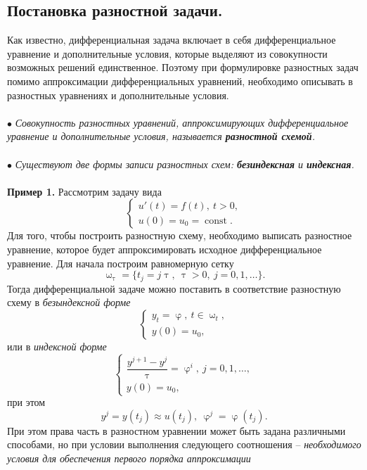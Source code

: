 \documentclass[a4paper, 12pt]{report}
\numberwithin{equation}{section}
\renewcommand{\varphi}{\upvarphi}
\renewcommand{\tau}{\uptau}
\renewcommand{\omega}{\upomega}
\newcommand{\const}{\operatorname{const}}
\begin{document}
\subsection{Постановка разностной задачи.}
Как известно, дифференциальная задача включает в себя дифференциальное уравнение и дополнительные условия, которые выделяют из совокупности возможных решений единственное. Поэтому при формулировке разностных задач помимо аппроксимации дифференциальных уравнений, необходимо описывать в разностных уравнениях и дополнительные условия.\\\\
$\bullet$ \textit{Совокупность разностных уравнений, аппроксимирующих дифференциальное уравнение и дополнительные условия, называется \textbf{разностной схемой}.}\\\\
$\bullet$ \textit{Существуют две формы записи разностных схем: \textbf{безиндексная} и \textbf{индексная}.}\\\\
\textbf{Пример 1.} Рассмотрим задачу вида 
\begin{equation}
	\begin{cases}
	u'(t) = f(t),\ t>0,\\
u(0) = u_0 = \const.
\end{cases}
\end{equation}
Для того, чтобы построить разностную схему, необходимо выписать разностное уравнение, которое будет аппроксимировать исходное дифференциальное уравнение. Для начала построим равномерную сетку $$\omega_\tau = \{t_j = j\tau,\ \tau>0,\ j=0,1,\ldots\}.$$
Тогда дифференциальной задаче можно поставить в соответствие разностную схему в \textit{безындексной форме}
\begin{equation}
	\begin{cases}
	y_t = \varphi,\ t \in \omega _t,\\
	y(0) = u_0,
\end{cases}
\end{equation}
или в \textit{индексной форме}
\begin{equation}
	\begin{cases}
		\dfrac{y^{j+1}-y^j}{\tau} = \varphi^i,\ j=0,1,\ldots,\\
		y(0) = u_0,
	\end{cases}
\end{equation}
при этом $$y^j = y(t_j)\approx u(t_j),\ \varphi^j = \varphi(t_j).$$
При этом права часть в разностном уравнении может быть задана различными способами, но при условии выполнения следующего соотношения -- \textit{необходимого условия для обеспечения первого порядка аппроксимации}
\end{document}
